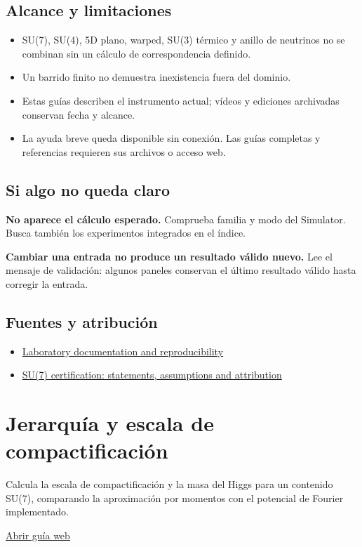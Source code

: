 \documentclass[11pt,a4paper]{article}
\begin{document}
\subsection*{Alcance y limitaciones}
\begin{itemize}
\item SU(7), SU(4), 5D plano, warped, SU(3) térmico y anillo de neutrinos no se combinan sin un cálculo de correspondencia definido.
\item Un barrido finito no demuestra inexistencia fuera del dominio.
\item Estas guías describen el instrumento actual; vídeos y ediciones archivadas conservan fecha y alcance.
\item La ayuda breve queda disponible sin conexión. Las guías completas y referencias requieren sus archivos o acceso web.
\end{itemize}
\subsection*{Si algo no queda claro}
\textbf{No aparece el cálculo esperado.} Comprueba familia y modo del Simulator. Busca también los experimentos integrados en el índice.

\textbf{Cambiar una entrada no produce un resultado válido nuevo.} Lee el mensaje de validación: algunos paneles conservan el último resultado válido hasta corregir la entrada.

\subsection*{Fuentes y atribución}
\begin{itemize}
\item \href{https://karlesmarin.github.io/ghu-explorer/docs/index.html}{Laboratory documentation and reproducibility}
\item \href{https://karlesmarin.github.io/ghu-explorer/docs/su7-certification.html}{SU(7) certification: statements, assumptions and attribution}
\end{itemize}
\section{Jerarquía y escala de compactificación}
Calcula la escala de compactificación y la masa del Higgs para un contenido SU(7), comparando la aproximación por momentos con el potencial de Fourier implementado.

\href{https://karlesmarin.github.io/ghu-explorer/guide/es/hierarchy/index.html}{Abrir guía web}
\end{document}

